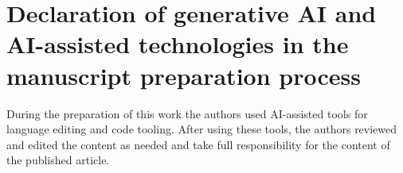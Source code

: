 \documentclass[sigconf,anonymous,review]{acmart}
\begin{document}

\maketitle








\section*{Declaration of generative AI and AI-assisted technologies in
the manuscript preparation process}
During the preparation of this work the authors used AI-assisted
tools for language editing and code tooling. After using these tools,
the authors reviewed and edited the content as needed and take full
responsibility for the content of the published article.





\end{document}
